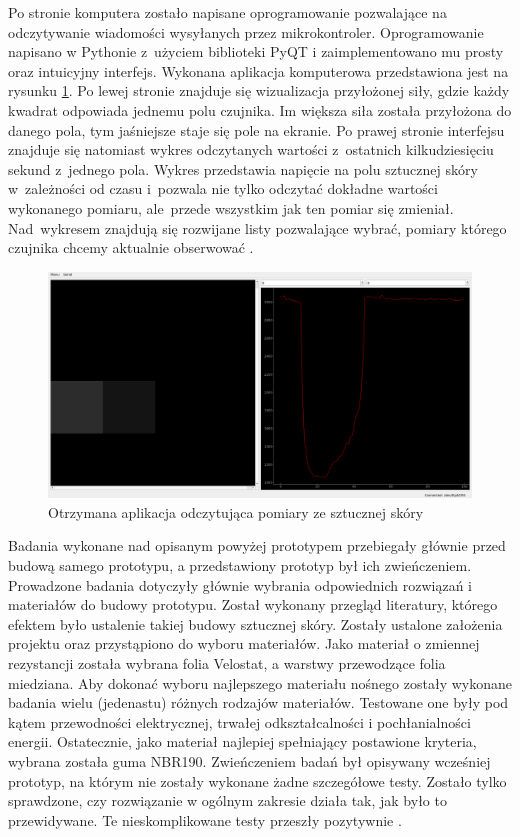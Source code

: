 Po stronie komputera zostało napisane oprogramowanie pozwalające na odczytywanie wiadomości wysyłanych przez mikrokontroler. Oprogramowanie napisano w Pythonie z~użyciem biblioteki PyQT i zaimplementowano mu prosty oraz intuicyjny interfejs. 
Wykonana aplikacja komputerowa przedstawiona jest na rysunku \ref{f_otrzymany_apka}.
Po lewej stronie znajduje się wizualizacja przyłożonej siły, gdzie każdy kwadrat odpowiada jednemu polu czujnika. Im większa siła została przyłożona do danego pola, tym jaśniejsze staje się pole na ekranie. Po prawej stronie interfejsu znajduje się natomiast wykres odczytanych wartości z~ostatnich kilkudziesięciu sekund z~jednego pola. Wykres przedstawia napięcie na polu sztucznej skóry w~zależności od czasu i~pozwala nie tylko odczytać dokładne wartości wykonanego pomiaru, ale~przede wszystkim jak ten pomiar się zmieniał.
Nad~wykresem znajdują się rozwijane listy pozwalające wybrać, pomiary którego czujnika chcemy aktualnie obserwować  \cite{b_report_otrzymane}.

\begin{figure}[!h]
    \centering 
    \includegraphics[width=0.95\linewidth]{img/otrzymane_apka.png}
    \caption{Otrzymana aplikacja odczytująca pomiary ze sztucznej skóry \cite{b_report_otrzymane}}
    \label{f_otrzymany_apka}
\end{figure}

Badania wykonane nad opisanym powyżej prototypem przebiegały głównie przed budową samego prototypu, a przedstawiony prototyp był ich zwieńczeniem. Prowadzone badania dotyczyły głównie wybrania odpowiednich rozwiązań i materiałów do budowy prototypu. Został wykonany przegląd literatury, którego efektem było ustalenie takiej budowy sztucznej skóry. Zostały ustalone założenia projektu oraz przystąpiono do wyboru materiałów. Jako materiał o zmiennej rezystancji została wybrana folia Velostat, a warstwy przewodzące folia miedziana. Aby dokonać wyboru najlepszego materiału nośnego zostały wykonane badania wielu (jedenastu) różnych rodzajów materiałów. Testowane one były pod kątem przewodności elektrycznej, trwałej odkształcalności i pochłanialności energii. Ostatecznie, jako materiał najlepiej spełniający postawione kryteria, wybrana została guma NBR190. Zwieńczeniem badań był opisywany wcześniej prototyp, na którym nie zostały wykonane żadne szczegółowe testy. Zostało tylko sprawdzone, czy rozwiązanie w ogólnym zakresie działa tak, jak było to przewidywane. Te nieskomplikowane testy przeszły pozytywnie \cite{b_report_otrzymane}.

